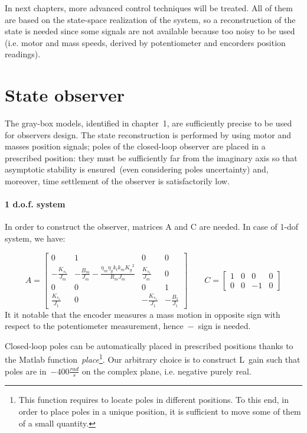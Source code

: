 
In next chapters, more advanced control techniques will be treated. All of them are based on the state-space realization of the system, so a reconstruction of the state is needed since some signals are not available because too noisy to be used (i.e. motor and mass speeds, derived by potentiometer and encorders position readings).

\section{State observer}

The gray-box models, identified in chapter~1, are sufficiently precise to be used for observers design. The state reconstruction is performed by using motor and masses position signals; poles of the closed-loop observer are placed in a prescribed position: they must be sufficiently far from the imaginary axis so that asymptotic stability is ensured~(even considering poles uncertainty) and, moreover, time settlement of the observer is satisfactorily low.

\paragraph{1 d.o.f. system}

In order to construct the observer, matrices A and C are needed. In case of 1-dof system, we have:

\begin{equation}
	A = 
	\begin{bmatrix}
		0 &1 & 0 & 0 \\
		-\frac{K_{s_1}}{J_m} & -\frac{B_m}{J_m}-\frac{\eta_m \eta_g k_t k_m {K_g}^2}{R_m J_m}  & \frac{K_{s_1}}{J_m} & 0 \\
		0 & 0 & 0 & 1 \\
		\frac{K_{s_1}}{J_1} & 0 & -\frac{K_{s_1}}{J_1} & -\frac{B_1}{J_1}
	\end{bmatrix}
	\qquad
	C =
	\begin{bmatrix}
		1 & 0 & 0 & 0 \\
		0 & 0 & -1 & 0
	\end{bmatrix}
\end{equation}
It it notable that the encoder measures a mass motion in opposite sign with respect to the potentiometer measurement, hence~$-$~sign is needed.

Closed-loop poles can be automatically placed in prescribed positions thanks to the Matlab function~\textit{place}\footnote{This function requires to locate poles in different positions. To this end, in order to place poles in a unique position, it is sufficient to move some of them of a small quantity.}.
Our arbitrary choice is to construct L~gain such that poles are in~$-400\frac{rad}{s}$ on the complex plane, i.e. negative purely real.

